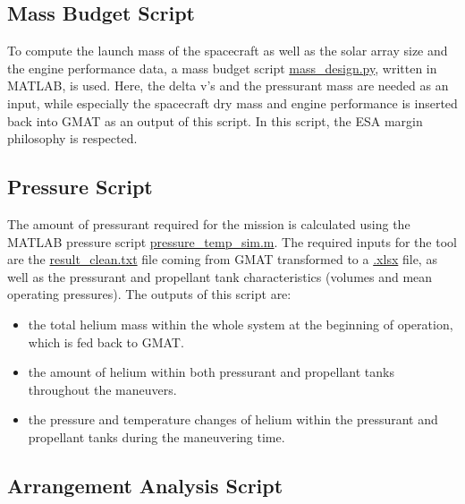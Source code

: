 \documentclass[conference]{IEEEtran}
\begin{document}
\subsection{Mass Budget Script}
\label{script:mass-design}

To compute the launch mass of the spacecraft as well as the solar array size and the engine performance data, a mass budget script \href{https://github.com/Sven-J-Steinert/MomenTUM/blob/main/MATLAB/mass_design.m}{\colorbox{codegray}{mass\_design.py}}, written in MATLAB, is used. Here, the delta v's and the pressurant mass are needed as an input, while especially the spacecraft dry mass and engine performance is inserted back into GMAT as an output of this script. In this script, the ESA margin philosophy \cite{ESA.2012} is respected.

\subsection{Pressure Script}

The amount of pressurant required for the mission is calculated using the MATLAB pressure script \href{https://github.com/Sven-J-Steinert/MomenTUM/blob/main/MATLAB/pressure_temp_sim.m}{\colorbox{codegray}{pressure\_temp\_sim.m}}. The required inputs for the tool are the \href{https://github.com/Sven-J-Steinert/MomenTUM/blob/main/GMAT/result/result_clean.txt}{\colorbox{codegray}{result\_clean.txt}} file coming from GMAT transformed to a \href{https://github.com/Sven-J-Steinert/MomenTUM/blob/main/MATLAB/GMAT_values_20.xlsx}{\colorbox{codegray}{.xlsx}} file, as well as the pressurant and propellant tank characteristics (volumes and mean operating pressures). The outputs of this script are:
\begin{itemize}
    \item the total helium mass within the whole system at the beginning of operation, which is fed back to GMAT.
    \item the amount of helium within both pressurant and propellant tanks throughout the maneuvers.
    \item the pressure and temperature changes of helium within the pressurant and propellant tanks during the maneuvering time.
\end{itemize}


\subsection{Arrangement Analysis Script}
\end{document}

